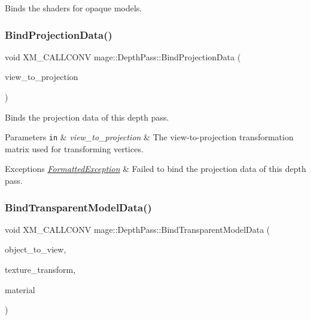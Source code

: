 Binds the shaders for opaque models. \hypertarget{classmage_1_1_depth_pass_a9fa93bf5d67b9396d358e595be55a075}{}\label{classmage_1_1_depth_pass_a9fa93bf5d67b9396d358e595be55a075} 
\subsubsection{\texorpdfstring{Bind\+Projection\+Data()}{BindProjectionData()}}
{\footnotesize\ttfamily void X\+M\+\_\+\+C\+A\+L\+L\+C\+O\+NV mage\+::\+Depth\+Pass\+::\+Bind\+Projection\+Data (\begin{DoxyParamCaption}\item[{F\+X\+M\+M\+A\+T\+R\+IX}]{view\+\_\+to\+\_\+projection }\end{DoxyParamCaption})\hspace{0.3cm}{\ttfamily [private]}}

Binds the projection data of this depth pass.


\begin{DoxyParams}[1]{Parameters}
\mbox{\tt in}  & {\em view\+\_\+to\+\_\+projection} & The view-\/to-\/projection transformation matrix used for transforming vertices. \\
\hline
\end{DoxyParams}

\begin{DoxyExceptions}{Exceptions}
{\em \hyperlink{classmage_1_1_formatted_exception}{Formatted\+Exception}} & Failed to bind the projection data of this depth pass. \\
\hline
\end{DoxyExceptions}
\hypertarget{classmage_1_1_depth_pass_a37236eb83793b4f11f1f4f2ed86f60e2}{}\label{classmage_1_1_depth_pass_a37236eb83793b4f11f1f4f2ed86f60e2} 
\subsubsection{\texorpdfstring{Bind\+Transparent\+Model\+Data()}{BindTransparentModelData()}}
{\footnotesize\ttfamily void X\+M\+\_\+\+C\+A\+L\+L\+C\+O\+NV mage\+::\+Depth\+Pass\+::\+Bind\+Transparent\+Model\+Data (\begin{DoxyParamCaption}\item[{F\+X\+M\+M\+A\+T\+R\+IX}]{object\+\_\+to\+\_\+view,  }\item[{C\+X\+M\+M\+A\+T\+R\+IX}]{texture\+\_\+transform,  }\item[{const \hyperlink{classmage_1_1_material}{Material} $\ast$}]{material }\end{DoxyParamCaption})\hspace{0.3cm}{\ttfamily [private]}}

